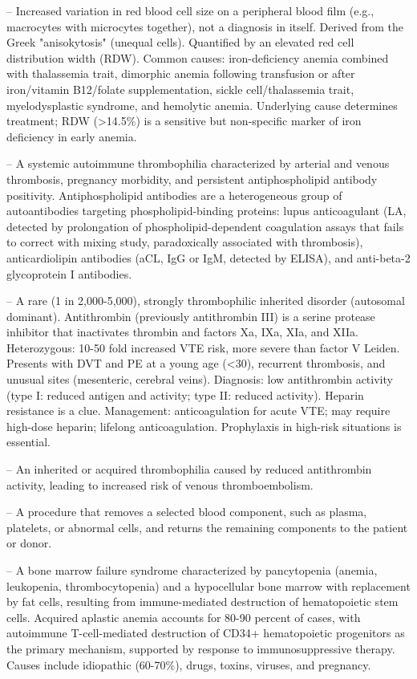 -- Increased variation in red blood cell size on a peripheral blood film (e.g., macrocytes with microcytes together), not a diagnosis in itself. Derived from the Greek "anisokytosis" (unequal cells). Quantified by an elevated red cell distribution width (RDW). Common causes: iron-deficiency anemia combined with thalassemia trait, dimorphic anemia following transfusion or after iron/vitamin B12/folate supplementation, sickle cell/thalassemia trait, myelodysplastic syndrome, and hemolytic anemia. Underlying cause determines treatment; RDW (>14.5\%) is a sensitive but non-specific marker of iron deficiency in early anemia.

-- A systemic autoimmune thrombophilia characterized by arterial and venous thrombosis, pregnancy morbidity, and persistent antiphospholipid antibody positivity. Antiphospholipid antibodies are a heterogeneous group of autoantibodies targeting phospholipid-binding proteins: lupus anticoagulant (LA, detected by prolongation of phospholipid-dependent coagulation assays that fails to correct with mixing study, paradoxically associated with thrombosis), anticardiolipin antibodies (aCL, IgG or IgM, detected by ELISA), and anti-beta-2 glycoprotein I antibodies.

-- A rare (1 in 2,000-5,000), strongly thrombophilic inherited disorder (autosomal dominant). Antithrombin (previously antithrombin III) is a serine protease inhibitor that inactivates thrombin and factors Xa, IXa, XIa, and XIIa. Heterozygous: 10-50 fold increased VTE risk, more severe than factor V Leiden. Presents with DVT and PE at a young age (<30), recurrent thrombosis, and unusual sites (mesenteric, cerebral veins). Diagnosis: low antithrombin activity (type I: reduced antigen and activity; type II: reduced activity). Heparin resistance is a clue. Management: anticoagulation for acute VTE; may require high-dose heparin; lifelong anticoagulation. Prophylaxis in high-risk situations is essential.

-- An inherited or acquired thrombophilia caused by reduced antithrombin activity, leading to increased risk of venous thromboembolism.

-- A procedure that removes a selected blood component, such as plasma, platelets, or abnormal cells, and returns the remaining components to the patient or donor.

-- A bone marrow failure syndrome characterized by pancytopenia (anemia, leukopenia, thrombocytopenia) and a hypocellular bone marrow with replacement by fat cells, resulting from immune-mediated destruction of hematopoietic stem cells. Acquired aplastic anemia accounts for 80-90 percent of cases, with autoimmune T-cell-mediated destruction of CD34+ hematopoietic progenitors as the primary mechanism, supported by response to immunosuppressive therapy. Causes include idiopathic (60-70\%), drugs, toxins, viruses, and pregnancy.

